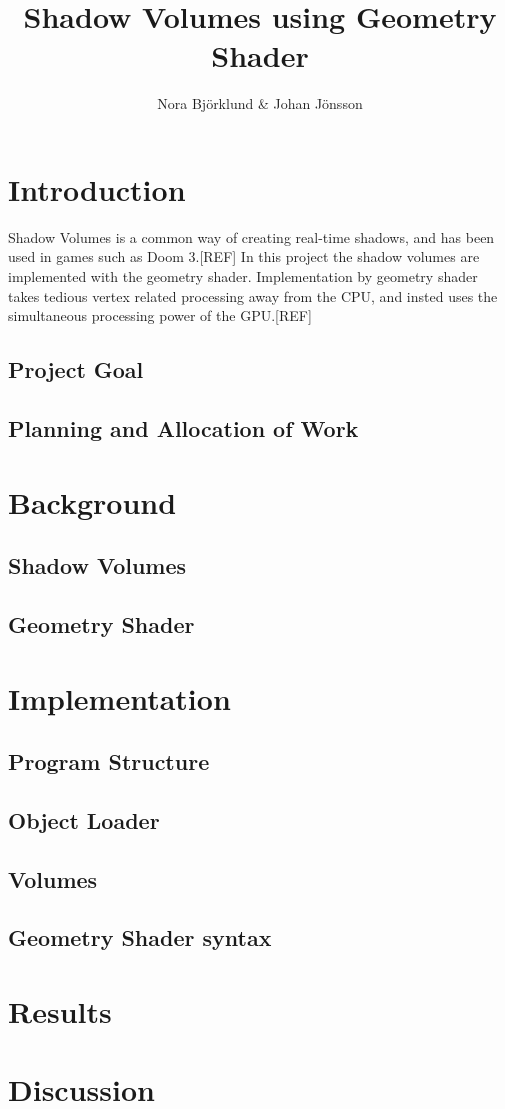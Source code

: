 \documentclass[a4paper, 12pt]{article}
\title{Shadow Volumes using Geometry Shader}
\author{Nora Björklund \& Johan Jönsson}
\begin{document}
\maketitle
\section{Introduction}
Shadow Volumes is a common way of creating real-time shadows, and has been used in games such as Doom 3.[REF] In this project the shadow volumes are implemented with the geometry shader. Implementation by geometry shader takes tedious vertex related processing away from the CPU, and insted uses the simultaneous processing power of the GPU.[REF]
\subsection{Project Goal}
\subsection{Planning and Allocation of Work}
\section{Background}
\subsection{Shadow Volumes}
\subsection{Geometry Shader}
\section{Implementation}
\subsection{Program Structure}
\subsection{Object Loader}
\subsection{Volumes}
\subsection{Geometry Shader syntax}
\section{Results}
\section{Discussion }
\end{document}
